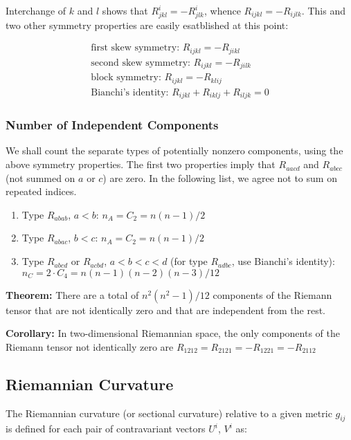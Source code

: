 \documentclass{article}
\begin{document}
Interchange of $k$ and $l$ shows that $R^i_{jkl} = -R^i_{jlk}$, whence $R_{ijkl} = -R_{ijlk}$.  This and two other symmetry properties are easily esatblished at this point:

\begin{align*}
	\text{first skew symmetry: } R_{ijkl} = -R_{jikl}\\
	\text{second skew symmetry: } R_{ijkl} = -R_{jilk}\\
	\text{block symmetry: } R_{ijkl} = -R_{klij}\\
	\text{Bianchi's identity: } R_{ijkl} + R_{iklj} + R_{iljk} = 0
\end{align*}

\subsubsection{Number of Independent Components}

We shall count the separate types of potentially nonzero components, using the above symmetry properties.  The first two properties imply that $R_{aacd}$ and $R_{abcc}$ (not summed on $a$ or $c$) are zero.
In the following list, we agree not to sum on repeated indices.

\begin{enumerate}
	\item Type $R_{abab}$, $a<b$: $n_A = C_2 = n(n-1)/2$ 
	\item Type $R_{abac}$, $b<c$: $n_A = C_2 = n(n-1)/2$
	\item Type $R_{abcd}$ or $R_{acbd}$, $a<b<c<d$ (for type $R_{adbc}$, use Bianchi's identity): $n_C = 2 \cdot C_4 = n(n-1)(n-2)(n-3)/12$
\end{enumerate}

\noindent \textbf{Theorem: }
There are a total of $n^2(n^2-1)/12$ components of the Riemann tensor that are not identically zero and that are independent from the rest.

\noindent \textbf{Corollary: }
In two-dimensional Riemannian space, the only components of the Riemann tensor not identically zero are $R_{1212} = R_{2121} = -R_{1221} = -R_{2112}$


\subsection{Riemannian Curvature}

The Riemannian curvature (or sectional curvature) relative to a given metric $g_{ij}$ is defined for each pair of contravariant vectors $U^i$, $V^i$ as:
\end{document}
